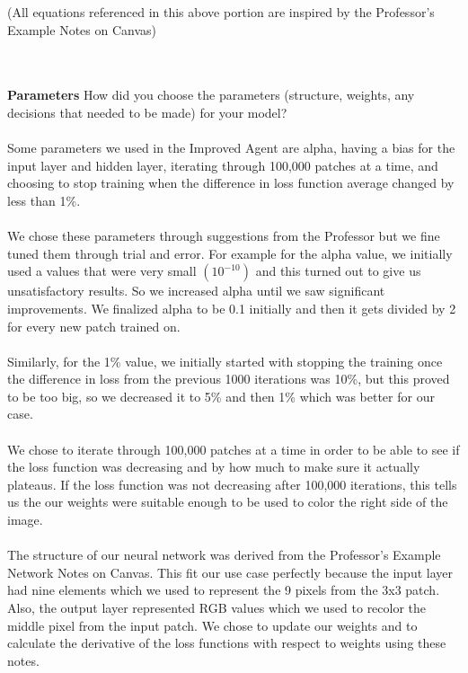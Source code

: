 \documentclass{article}
\theoremstyle{definition}
\begin{document}
        (All equations referenced in this above portion are inspired by the Professor's Example Notes on Canvas)
        
    \\\\
    
    \textbf{Parameters}
        How did you choose the parameters (structure, weights, any decisions that needed to be made) for your model? \\\\
        Some parameters we used in the Improved Agent are alpha, having a bias for the input layer and hidden layer, iterating through 100,000 patches at a time, and choosing to stop training when the difference in loss function average changed by less than 1\%. \\\\
        We chose these parameters through suggestions from the Professor but we fine tuned them through trial and error. For example for the alpha value, we initially used a values that were very small $(10^{-10})$ and this turned out to give us unsatisfactory results. So we increased alpha until we saw significant improvements. We finalized alpha to be 0.1 initially and then it gets divided by 2 for every new patch trained on. \\\\
        Similarly, for the 1\% value, we initially started with stopping the training once the difference in loss from the previous 1000 iterations was 10\%, but this proved to be too big, so we decreased it to 5\% and then 1\% which was better for our case. \\\\
        We chose to iterate through 100,000 patches at a time in order to be able to see if the loss function was decreasing and by how much to make sure it actually plateaus. If the loss function was not decreasing after 100,000 iterations, this tells us the our weights were suitable enough to be used to color the right side of the image. \\\\
        The structure of our neural network was derived from the Professor's Example Network Notes on Canvas. This fit our use case perfectly because the input layer had nine elements which we used to represent the 9 pixels from the 3x3 patch. Also, the output layer represented RGB values which we used to recolor the middle pixel from the input patch. We chose to update our weights and to calculate the derivative of the loss functions with respect to weights using these notes.
        
\end{document}

